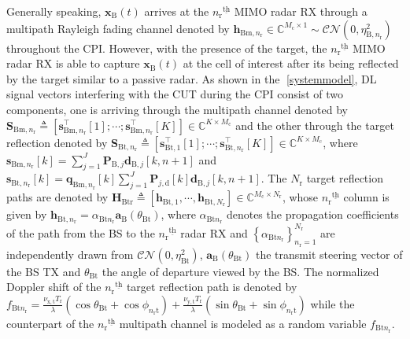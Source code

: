 \documentclass[conference]{IEEEtran}
\newcommand{\paren}[1]{\left({#1}\right)}
\newcommand{\bracket}[1]{{\left [{#1}\right ]}}
\newcommand{\braces}[1]{{\left\{ {#1}\right\}}}
\newcommand{\ith}[1]    {{#1}^{\underline{\text{th}}}}
\newcommand{\rr}{_\mathrm{r}}
\newcommand{\cc}{_\mathrm{c}}
\newcommand{\B}{\mathrm{B}}
\newcommand{\target}{\mathrm{t}}
\newcommand{\PBj}{\mathbf{P}_{j,\textrm{d}}\bracket{k}}
\begin{document}
Generally speaking, $\mathbf{x}_{\mathrm{B}}(t)$ arrives at the $\ith{n\rr}$ MIMO radar RX through a multipath Rayleigh fading channel denoted by $\mathbf{h}_{\mathrm{Bm},n\rr}\in\mathbb{C}^{M_\mathrm{c}\times1}\sim \mathcal{CN}\paren{0,\eta^2_{\mathrm{B},n\rr}}$ throughout the CPI. %
	However, with the presence of the target, the $\ith{n\rr}$ MIMO radar RX is able to capture $\mathbf{x}_\mathrm{B}(t)$ at the cell of interest after its being reflected by the target similar to a passive radar. As shown in the \figurename{$\;$\ref{systemmodel}}, DL signal vectors interfering with the CUT during the CPI consist of two components, one is arriving through the multipath channel denoted by $\mathbf{S}_{\mathrm{Bm},n\rr}\triangleq\bracket{\mathbf{s}^\top_{\mathrm{Bm},n\rr}\bracket{1};\cdots;\mathbf{s}^\top_{\mathrm{Bm},n\rr}\bracket{K}}\in\mathbb{C}^{K\times M\cc}$ and the other through the target reflection denoted by $\mathbf{S}_{\mathrm{Bt,}n\rr}\triangleq\bracket{\mathbf{s}^\top_{\mathrm{Bt},1}\bracket{1};\cdots;\mathbf{s}^\top_{\mathrm{Bt},n\rr}\bracket{K}}\in\mathbb{C}^{K\times M\cc}$, where
	$\mathbf{s}_{\mathrm{Bm},n\rr}\bracket{k}=\sum_{j=1}^{J}\mathbf{P}_{\mathrm{B},j}\mathbf{d}_{\mathrm{B},j}\bracket{k,n+1}$ and $\mathbf{s}_{\mathrm{Bt},n\rr}\bracket{k}=\mathbf{q}_{\mathrm{Bm},n\rr}\bracket{k}
	\sum_{j=1}^J\PBj\mathbf{d}_{\B,j}\bracket{k,n+1}$. The $N\rr$ target reflection paths are denoted by $\mathbf{H}_{\mathrm{Btr}}\triangleq\bracket{\mathbf{h}_{\mathrm{Bt,}1},\cdots,\mathbf{h}_{\mathrm{Bt,}N\rr}}\in\mathbb{C}^{M\cc\times N\rr}$, whose $\ith{n\rr}$ column is given by $\mathbf{h}_{\mathrm{Bt,}n\rr}=\alpha_{\mathrm{Bt}n_\mathrm{r}}\mathbf{a}_\mathrm{B}\paren{\theta_{\mathrm{Bt}}}$, where $\alpha_{\mathrm{Bt}n_\mathrm{r}}$ denotes the propagation coefficients of the path from the BS to the $\ith{n\rr}$ radar RX and $\braces{\alpha_{\mathrm{Bt}n_\mathrm{r}}}_{n\rr=1}^{N\rr}$ are independently drawn from $\mathcal{CN}\paren{0,\eta^2_{\mathrm{Bt}}}$,  $\mathbf{a}_\mathrm{B}\paren{\theta_{\mathrm{Bt}}}$ the transmit steering vector of the BS TX and $\theta_{\mathrm{Bt}}$ the angle of departure viewed by the BS. The normalized Doppler shift of the $\ith{n\rr}$ target reflection path is denoted by $f_{\mathrm{B}\target n_\mathrm{r}}=\frac{\nu_{\mathrm{x},\mathrm{t}} T\rr}{\lambda}\paren{\cos\theta_{\mathrm{Bt}}+\cos\phi_{n_\mathrm{r}\mathrm{t}}}+\frac{\nu_{\mathrm{y},\mathrm{t}}T\rr}{\lambda}\paren{\sin\theta_{\mathrm{Bt}}+\sin\phi_{n_\mathrm{r}\mathrm{t}}}$ while the counterpart of the $\ith{n\rr}$ multipath channel is modeled as a random variable $f_{\mathrm{B}\target n_\mathrm{r}}$. 
\end{document}
